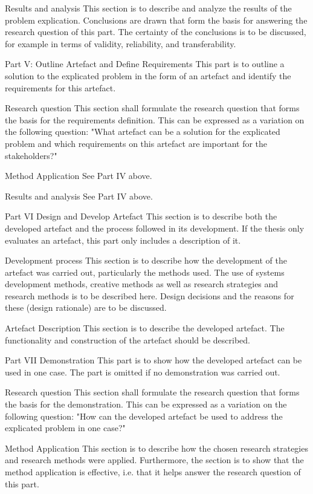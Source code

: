 {Results and analysis
This section is to describe and analyze the results of the problem
explication. Conclusions are drawn that form the basis for answering
the research question of this part. The certainty of the conclusions is
to be discussed, for example in terms of validity, reliability, and
transferability.

Part V: Outline Artefact and Define Requirements
This part is to outline a solution to the explicated problem in the
form of an artefact and identify the requirements for this artefact.

Research question
This section shall formulate the research question that forms the
basis for the requirements definition. This can be expressed as a
variation on the following question: "What artefact can be a solution
for the explicated problem and which requirements on this artefact
are important for the stakeholders?"

Method Application
See Part IV above.

Results and analysis
See Part IV above.

Part VI Design and Develop Artefact
This section is to describe both the developed artefact and the process
followed in its development. If the thesis only evaluates an artefact,
this part only includes a description of it.

Development process
This section is to describe how the development of the artefact was
carried out, particularly the methods used. The use of systems development
methods, creative methods as well as research strategies
and research methods is to be described here. Design decisions and
the reasons for these (design rationale) are to be discussed.

Artefact Description
This section is to describe the developed artefact. The functionality
and construction of the artefact should be described.

Part VII Demonstration
This part is to show how the developed artefact can be used in one
case. The part is omitted if no demonstration was carried out.

Research question
This section shall formulate the research question that forms the
basis for the demonstration. This can be expressed as a variation on 
the following question: "How can the developed artefact be used to
address the explicated problem in one case?"

Method Application
This section is to describe how the chosen research strategies and
research methods were applied. Furthermore, the section is to show
that the method application is effective, i.e. that it helps answer the
research question of this part.

}
